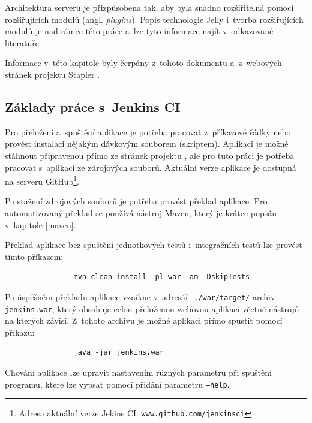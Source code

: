             Architektura serveru je přizpůsobena tak, aby byla snadno rozšiřitelná
            pomocí rozšiřujících modulů (angl. \emph{plugins}). Popis technologie Jelly
            i~tvorba rozšiřujících modulů je nad rámec této práce a~lze tyto informace
            najít v~odkazované literatuře.
        
            Informace v~této kapitole byly čerpány z~tohoto dokumentu \cite{architectureOverview}
            a~z~webových stránek projektu Stapler \cite{staplerWeb}.

        \subsection{Základy práce s~Jenkins CI} \label{jenkinsUsage}
            Pro přeložení a~spuštění aplikace je potřeba pracovat z~příkazové řádky nebo provést instalaci nějakým dávkovým souborem (skriptem).
            Aplikaci je možné stáhnout připravenou přímo ze stránek projektu \cite{jenkinsWeb}, ale pro tuto práci je potřeba 
            pracovat s~aplikací ze zdrojových souborů. Aktuální verze aplikace je dostupná na serveru 
            GitHub\footnote{Adresa aktuální verze Jekins CI: \texttt{www.github.com/jenkinsci}}.

            Po stažení zdrojových souborů je potřeba provést překlad aplikace. Pro automatizovaný 
            překlad se používá nástroj Maven, který je krátce popsán v~kapitole \ref{maven}. 
            
            Překlad aplikace bez spuštění jednotkových testů i~integračních testů lze provést tímto příkazem:
            \begin{verbatim}
                mvn clean install -pl war -am -DskipTests
            \end{verbatim}
            
            \medskip
            Po úspěšném překladu aplikace vznikne v~adresáři \texttt{./war/target/} archiv \texttt{jenkins.war}, 
            který obsahuje celou přeloženou webovou aplikaci včetně nástrojů na 
            kterých závisí. Z~tohoto archivu je možné aplikaci přímo spustit pomocí příkazu:

            \begin{verbatim}
                java -jar jenkins.war
            \end{verbatim}
            Chování aplikace lze upravit nastavením různých parametrů při spuštění programu, 
            které lze vypsat pomocí přidání parametru \texttt{--help}.

